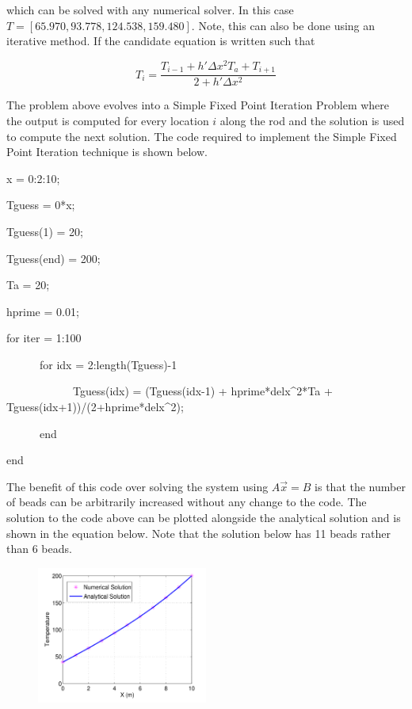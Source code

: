 \begin{enumerate}
    which can be solved with any numerical solver. In this case $T = [
      65.970,93.778,124.538,159.480]$. Note, this can also
    be done using an iterative method. If the candidate equation is
    written such that
    
    \begin{equation}
      T_{i} = \frac{T_{i-1} + h'\Delta x^2 T_a + T_{i+1}}{2+h'\Delta x^2}
    \end{equation}

    The problem above evolves into a Simple Fixed Point Iteration
    Problem where the output is computed for every location $i$ along
    the rod and the solution is used to compute the next solution. The
    code required to implement the Simple Fixed Point Iteration
    technique is shown below.

    \begin{framed}
      x = 0:2:10;

      Tguess = 0*x;

      Tguess(1) = 20;

      Tguess(end) = 200;

      Ta = 20;

      hprime = 0.01;

      for iter = 1:100

      ~~~~~~for idx = 2:length(Tguess)-1

      ~~~~~~~~~~~~Tguess(idx) = (Tguess(idx-1) + hprime*delx{\textrm{\^}2}*Ta + Tguess(idx+1))/(2+hprime*delx{\textrm{\^}2});

      ~~~~~~end

      end
    \end{framed}

    The benefit of this code over solving the system using
    $A\vec{x}=B$ is that the number of beads can be arbitrarily
    increased without any change to the code. The solution to the code
    above can be plotted alongside the analytical solution and is
    shown in the equation below. Note that the solution below has 11
    beads rather than 6 beads. 

    \begin{figure}[H]
     \begin{center}
       \includegraphics[height=0.4\textwidth,width=0.5\textwidth]{Graphics/Heat_Equation}
     \end{center}
   \end{figure}

\end{enumerate}
